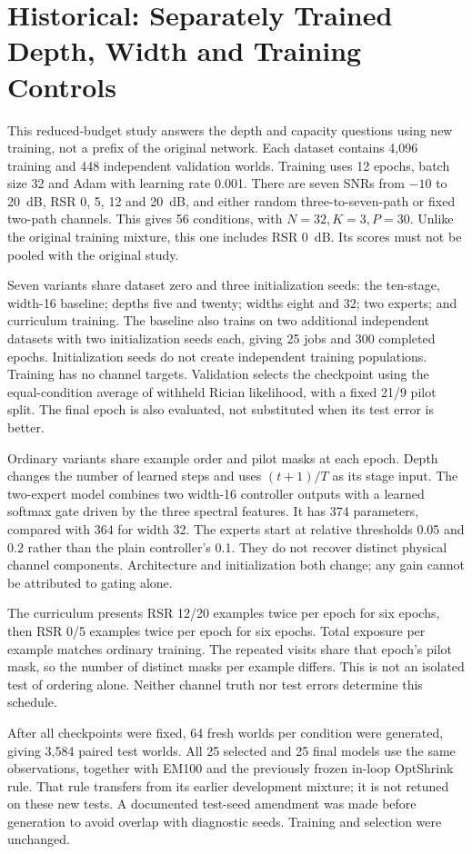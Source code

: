 \section{Historical: Separately Trained Depth, Width and Training Controls}
This reduced-budget study answers the depth and capacity questions using
new training, not a prefix of the original network. Each dataset contains
4,096 training and 448 independent validation worlds. Training uses 12
epochs, batch size 32 and Adam with learning rate 0.001. There are seven
SNRs from $-10$ to 20~dB, RSR 0, 5, 12 and 20~dB, and either random
three-to-seven-path or fixed two-path channels. This gives 56 conditions,
with $N=32,K=3,P=30$. Unlike the original training mixture, this one
includes RSR 0~dB. Its scores must not be pooled with the original study.

Seven variants share dataset zero and three initialization seeds: the
ten-stage, width-16 baseline; depths five and twenty; widths eight and
32; two experts; and curriculum training. The baseline also trains on
two additional independent datasets with two initialization seeds each,
giving 25 jobs and 300 completed epochs. Initialization seeds do not
create independent training populations. Training has no channel targets.
Validation selects the checkpoint using the equal-condition average of
withheld Rician likelihood, with a fixed 21/9 pilot split. The final
epoch is also evaluated, not substituted when its test error is better.

Ordinary variants share example order and pilot masks at each epoch.
Depth changes the number of learned steps and uses $(t+1)/T$ as its
stage input. The two-expert model combines two width-16 controller outputs
with a learned softmax gate driven by the three spectral features. It has
374 parameters, compared with 364 for width 32. The experts start at
relative thresholds 0.05 and 0.2 rather than the plain controller's 0.1.
They do not recover distinct physical channel components. Architecture
and initialization both change; any gain cannot be attributed to gating
alone.

The curriculum presents RSR 12/20 examples twice per epoch for six epochs,
then RSR 0/5 examples twice per epoch for six epochs. Total exposure per
example matches ordinary training. The repeated visits share that epoch's
pilot mask, so the number of distinct masks per example differs. This is
not an isolated test of ordering alone. Neither channel truth nor test
errors determine this schedule.

After all checkpoints were fixed, 64 fresh worlds per condition were
generated, giving 3,584 paired test worlds. All 25 selected and 25 final
models use the same observations, together with EM100 and the previously
frozen in-loop OptShrink rule. That rule transfers from its earlier
development mixture; it is not retuned on these new tests. A documented
test-seed amendment was made before generation to avoid overlap with
diagnostic seeds. Training and selection were unchanged.

